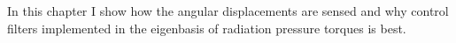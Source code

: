 In this chapter I show how the angular displacements are sensed and
why control filters implemented in the eigenbasis of radiation
pressure torques is best. 









